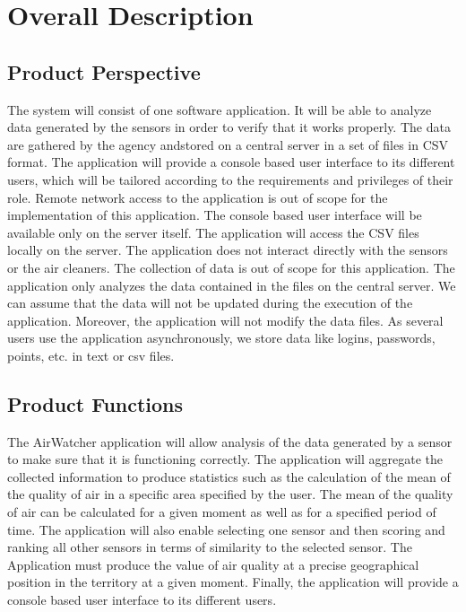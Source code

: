 \documentclass{report}
\begin{document}
\chapter{Overall Description}

\section{Product Perspective}
The system will consist of one software application. It will be able to
analyze data generated by the sensors in order to verify that it works properly.
The data are gathered by the agency andstored on a central server in a set of files in CSV format.
The application will provide a console based user interface to its different users, which will be
tailored according to the requirements and privileges of their role. Remote network access to the
application is out of scope for the implementation of this application. The console based user
interface will be available only on the server itself. The application will access the CSV files locally
on the server.
The application does not interact directly with the sensors or the air cleaners. The
collection of data is out of scope for this application. The application only analyzes the data
contained in the files on the central server. We can assume that the data will not be updated during
the execution of the application. Moreover, the application will not modify the data files.
As several users use the application asynchronously, we store data like logins, passwords, points, etc.
in text or csv files.



\section{Product Functions}
The AirWatcher application will allow analysis of the data generated by
a sensor to make sure that it is functioning correctly. The application
will aggregate the collected information to produce statistics such as the
calculation of the mean of the quality of air in a specific area specified
by the user. The mean of the quality of air can be calculated for a given
moment as well as for a specified period of time. The application will also
enable selecting one sensor and then scoring and ranking all other sensors
in terms of similarity to the selected sensor. The Application must produce
the value of air quality at a precise geographical position in the territory
at a given moment. Finally, the application will provide a console based
user interface to its different users.
\end{document}
